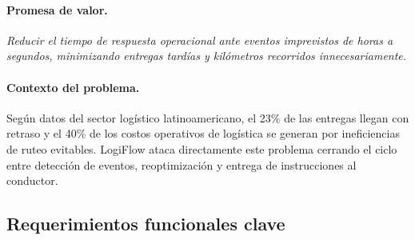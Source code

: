\documentclass[12pt,a4paper,oneside]{article}
\begin{document}
\paragraph{Promesa de valor.} \textit{Reducir el tiempo de respuesta operacional ante eventos imprevistos de horas a segundos, minimizando entregas tard\'ias y kil\'ometros recorridos innecesariamente.}

\paragraph{Contexto del problema.} Seg\'un datos del sector log\'istico latinoamericano, el 23\% de las entregas llegan con retraso y el 40\% de los costos operativos de log\'istica se generan por ineficiencias de ruteo evitables. LogiFlow ataca directamente este problema cerrando el ciclo entre detecci\'on de eventos, reoptimizaci\'on y entrega de instrucciones al conductor.

\subsection{Requerimientos funcionales clave}
\end{document}
